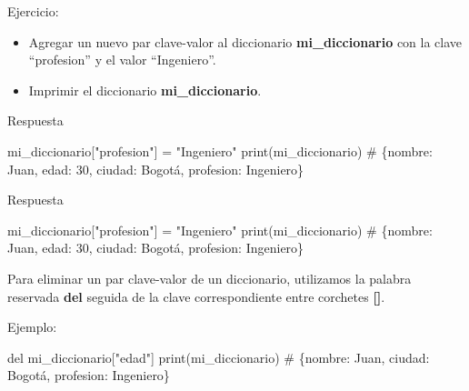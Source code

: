 \documentclass[
  a4paper,
  DIV=11,
  numbers=noendperiod,
  onepage,
  openany]{scrreprt}
\newenvironment{Shaded}{\begin{snugshade}}{\end{snugshade}}
\newcommand{\BuiltInTok}[1]{\textcolor[rgb]{0.00,0.23,0.31}{#1}}
\newcommand{\CommentTok}[1]{\textcolor[rgb]{0.37,0.37,0.37}{#1}}
\newcommand{\KeywordTok}[1]{\textcolor[rgb]{0.00,0.23,0.31}{#1}}
\newcommand{\NormalTok}[1]{\textcolor[rgb]{0.00,0.23,0.31}{#1}}
\newcommand{\OperatorTok}[1]{\textcolor[rgb]{0.37,0.37,0.37}{#1}}
\newcommand{\StringTok}[1]{\textcolor[rgb]{0.13,0.47,0.30}{#1}}
\providecommand{\tightlist}{%
  \setlength{\itemsep}{0pt}\setlength{\parskip}{0pt}}\usepackage{longtable,booktabs,array}
\begin{document}
Ejercicio:

\begin{itemize}
\tightlist
\item
  Agregar un nuevo par clave-valor al diccionario
  \textbf{mi\_diccionario} con la clave ``profesion'' y el valor
  ``Ingeniero''.
\item
  Imprimir el diccionario \textbf{mi\_diccionario}.
\end{itemize}

Respuesta

\begin{Shaded}
\begin{Highlighting}[]
\NormalTok{mi\_diccionario[}\StringTok{"profesion"}\NormalTok{] }\OperatorTok{=} \StringTok{"Ingeniero"}
\BuiltInTok{print}\NormalTok{(mi\_diccionario)  }\CommentTok{\# \{\textquotesingle{}nombre\textquotesingle{}: \textquotesingle{}Juan\textquotesingle{}, \textquotesingle{}edad\textquotesingle{}: 30, \textquotesingle{}ciudad\textquotesingle{}: \textquotesingle{}Bogotá\textquotesingle{}, \textquotesingle{}profesion\textquotesingle{}: \textquotesingle{}Ingeniero\textquotesingle{}\}}
\end{Highlighting}
\end{Shaded}

Respuesta

\begin{Shaded}
\begin{Highlighting}[]
\NormalTok{mi\_diccionario[}\StringTok{"profesion"}\NormalTok{] }\OperatorTok{=} \StringTok{"Ingeniero"}
\BuiltInTok{print}\NormalTok{(mi\_diccionario)  }\CommentTok{\# \{\textquotesingle{}nombre\textquotesingle{}: \textquotesingle{}Juan\textquotesingle{}, \textquotesingle{}edad\textquotesingle{}: 30, \textquotesingle{}ciudad\textquotesingle{}: \textquotesingle{}Bogotá\textquotesingle{}, \textquotesingle{}profesion\textquotesingle{}: \textquotesingle{}Ingeniero\textquotesingle{}\}}
\end{Highlighting}
\end{Shaded}

Para eliminar un par clave-valor de un diccionario, utilizamos la
palabra reservada \textbf{del} seguida de la clave correspondiente entre
corchetes \textbf{{[}{]}}.

Ejemplo:

\begin{Shaded}
\begin{Highlighting}[]
\KeywordTok{del}\NormalTok{ mi\_diccionario[}\StringTok{"edad"}\NormalTok{]}
\BuiltInTok{print}\NormalTok{(mi\_diccionario)  }\CommentTok{\# \{\textquotesingle{}nombre\textquotesingle{}: \textquotesingle{}Juan\textquotesingle{}, \textquotesingle{}ciudad\textquotesingle{}: \textquotesingle{}Bogotá\textquotesingle{}, \textquotesingle{}profesion\textquotesingle{}: \textquotesingle{}Ingeniero\textquotesingle{}\}}
\end{Highlighting}
\end{Shaded}
\end{document}

